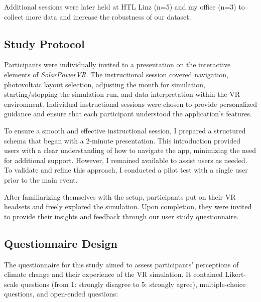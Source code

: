 \documentclass[draft, final]{vutinfth} %
\begin{document}
Additional sessions were later held at HTL Linz (n=5) and my office (n=3) to collect more data and increase the robustness of our dataset.

\subsection{Study Protocol}

Participants were individually invited to a presentation on the interactive elements of \textit{SolarPowerVR}. The instructional session covered navigation, photovoltaic layout selection, adjusting the month for simulation, starting/stopping the simulation run, and data interpretation within the VR environment. Individual instructional sessions were chosen to provide personalized guidance and ensure that each participant understood the application's features.

To ensure a smooth and effective instructional session, I prepared a structured schema that began with a 2-minute presentation. This introduction provided users with a clear understanding of how to navigate the app, minimizing the need for additional support. However, I remained available to assist users as needed. To validate and refine this approach, I conducted a pilot test with a single user prior to the main event.

After familiarizing themselves with the setup, participants put on their VR headsets and freely explored the simulation. Upon completion, they were invited to provide their insights and feedback through our user study questionnaire.

\subsection{Questionnaire Design}

The questionnaire for this study aimed to assess participants' perceptions of climate change and their experience of the VR simulation. It contained Likert-scale questions (from 1: strongly disagree to 5: strongly agree), multiple-choice questions, and open-ended questions:
\end{document}
